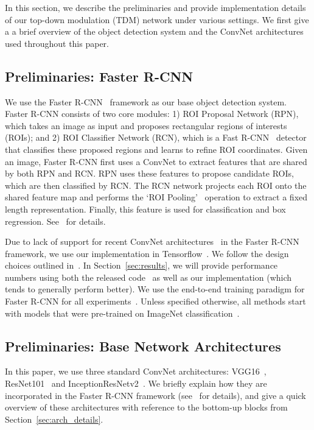 \documentclass[10pt,twocolumn,letterpaper]{article}
\begin{document}
In this section, we describe the preliminaries and provide implementation details of our top-down modulation (TDM) network under various settings. We first give a a brief overview of the object detection system and the ConvNet architectures used throughout this paper.

\subsection{Preliminaries: Faster R-CNN}\label{sec:frrcn}
We use the Faster R-CNN~\cite{ren2015faster} framework as our base object detection system.
Faster R-CNN consists of two core modules: 1) ROI Proposal Network (RPN), which takes an image as input and proposes rectangular regions of interests (ROIs); and 2) ROI Classifier Network (RCN), which is a Fast R-CNN~\cite{girshick2015fast} detector that classifies these proposed regions and learns to refine ROI coordinates. Given an image, Faster R-CNN first uses a ConvNet to extract features that are shared by both RPN and RCN. RPN uses these features to propose candidate ROIs, which are then classified by RCN. The RCN network projects each ROI onto the shared feature map and performs the `ROI Pooling'~\cite{girshick2015fast,he2014spatial} operation to extract a fixed length representation.
Finally, this feature is used for classification and box regression. See~\cite{girshick2015fast,he2014spatial,ren2015faster,huang2016speed} for details.

Due to lack of support for recent ConvNet architectures~\cite{resnet,szegedy2016inception} in the Faster R-CNN framework, we use our implementation in Tensorflow~\cite{abadi2016tensorflow}. We follow the design choices outlined in~\cite{huang2016speed}.
In Section~\ref{sec:results}, we will provide performance numbers using both the released code~\cite{ren2015faster} as well as our implementation (which tends to generally perform better). We use the end-to-end training paradigm for Faster R-CNN for all experiments~\cite{ren2015faster}. Unless specified otherwise, all methods start with models that were pre-trained on ImageNet classification~\cite{imagenet,rcnn}. 

\vspace{-0.01in}
\subsection{Preliminaries: Base Network Architectures}
\vspace{-0.01in}
In this paper, we use three standard ConvNet architectures: VGG16~\cite{VGG}, ResNet101~\cite{resnet} and InceptionResNetv2~\cite{szegedy2016inception}. We briefly explain how they are incorporated in the Faster R-CNN framework (see~\cite{ren2015faster,resnet,huang2016speed} for details), and give a quick overview of these architectures with reference to the bottom-up blocks  from Section~\ref{sec:arch_details}.
\end{document}
